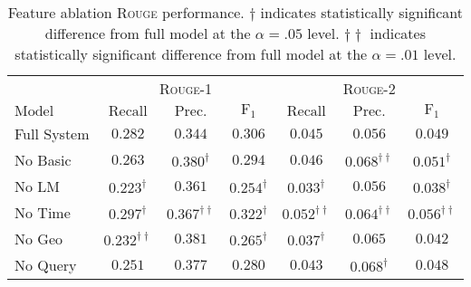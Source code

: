 \begin{table}[h]
\centering
\begin{tabular}{l c c c ccc}
    \toprule
    & \multicolumn{3}{c}{\textsc{Rouge}-1}
    & \multicolumn{3}{c}{\textsc{Rouge}-2}\\
    \cmidrule(lr){2-4} \cmidrule(lr){5-7}
$\mathrm{Model}$ & $\mathrm{Recall}$ & $\mathrm{Prec.}$ & $\mathrm{F}_1$
& $\mathrm{Recall}$ & $\mathrm{Prec.}$ & $\mathrm{F}_1$\\
\midrule
Full System & $0.282$ & $0.344$ & $0.306$ & $0.045$ & $0.056$ & $0.049$\\
No Basic    & $0.263$ & $0.380^\dagger$ & $0.294$ & $0.046$ & $0.068^{\dagger\dagger}$ & $0.051^\dagger$\\
No LM       & $0.223^\dagger$ & $0.361$ & $0.254^\dagger$ & $0.033^\dagger$ & $0.056$ & $0.038^\dagger$\\
No Time  & $0.297^\dagger$ & $0.367^{\dagger\dagger}$ & $0.322^\dagger$ & $0.052^{\dagger\dagger}$ & $0.064^{\dagger\dagger}$ & $0.056^{\dagger\dagger}$ \\ 
No Geo   & $0.232^{\dagger\dagger}$ & $0.381$ & $0.265^\dagger$ & $0.037^\dagger$ & $0.065$ & $0.042$ \\  
No Query & $0.251$ & $0.377$ & $0.280$ & $0.043$ & $0.068^\dagger$ & $0.048$ \\
\bottomrule
\end{tabular}
\caption{Feature ablation \textsc{Rouge} performance. 
    $\dagger$ indicates statistically significant difference from 
full model at the $\alpha=.05$ level.
    $\dagger\dagger$ indicates statistically significant difference from 
full model at the $\alpha=.01$ level.
    } %
\label{tab:farouge}
\end{table}






